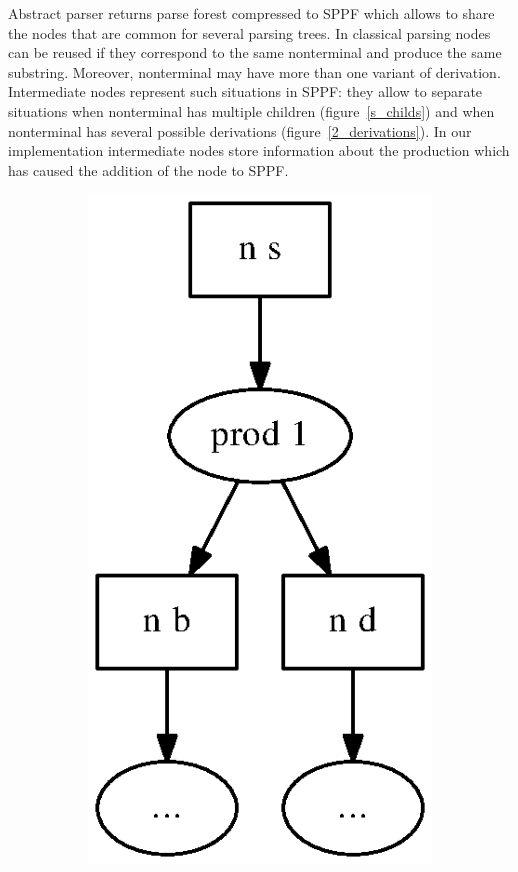 \documentclass{acm_proc_article-sp}
\begin{document}
Abstract parser returns parse forest compressed to SPPF which allows to share the nodes that are common for several parsing trees. In classical parsing nodes can be reused if they correspond to the same nonterminal and produce the same substring. Moreover, nonterminal may have more than one variant of derivation. Intermediate nodes represent such situations in SPPF: they allow to separate situations when nonterminal has multiple children (figure~\ref{s_childs}) and when nonterminal has several possible derivations (figure~\ref{2_derivations}). In our implementation intermediate nodes store information about the production which has caused the addition of the node to SPPF.

\begin{figure}[h!]
  \begin{center}
    \begin{subfigure}{0.2\textwidth}    
        \includegraphics[scale=0.3]{graphs/SPPF_idea1.eps}    

\end{subfigure}
\end{center}
\end{figure}
\end{document}
